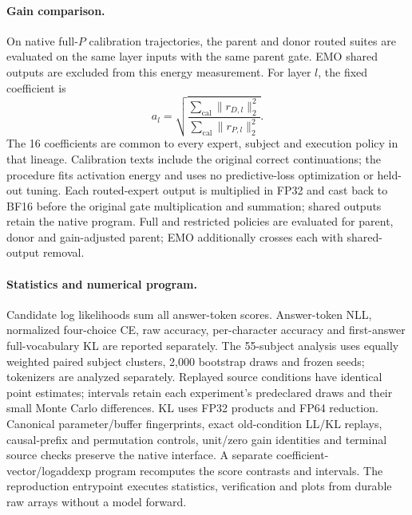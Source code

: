 \documentclass[10pt,twocolumn]{article}
\begin{document}
\paragraph{Gain comparison.}
On native full-$P$ calibration trajectories, the parent and donor routed suites are evaluated on the same layer inputs with the same parent gate.
EMO shared outputs are excluded from this energy measurement.
For layer $l$, the fixed coefficient is
\begin{equation}
 a_l=\sqrt{\frac{\sum_{\mathrm{cal}}\lVert r_{D,l}\rVert_2^2}
                         {\sum_{\mathrm{cal}}\lVert r_{P,l}\rVert_2^2}}.
\end{equation}
The 16 coefficients are common to every expert, subject and execution policy in that lineage.
Calibration texts include the original correct continuations; the procedure fits activation energy and uses no predictive-loss optimization or held-out tuning.
Each routed-expert output is multiplied in FP32 and cast back to BF16 before the original gate multiplication and summation; shared outputs retain the native program.
Full and restricted policies are evaluated for parent, donor and gain-adjusted parent; EMO additionally crosses each with shared-output removal.

\paragraph{Statistics and numerical program.}
Candidate log likelihoods sum all answer-token scores.
Answer-token NLL, normalized four-choice CE, raw accuracy, per-character accuracy and first-answer full-vocabulary KL are reported separately.
The 55-subject analysis uses equally weighted paired subject clusters, 2,000 bootstrap draws and frozen seeds; tokenizers are analyzed separately. Replayed source conditions have identical point estimates; intervals retain each experiment's predeclared draws and their small Monte Carlo differences.
KL uses FP32 products and FP64 reduction.
Canonical parameter/buffer fingerprints, exact old-condition LL/KL replays, causal-prefix and permutation controls, unit/zero gain identities and terminal source checks preserve the native interface.
A separate coefficient-vector/logaddexp program recomputes the score contrasts and intervals.
The reproduction entrypoint executes statistics, verification and plots from durable raw arrays without a model forward.
\end{document}

